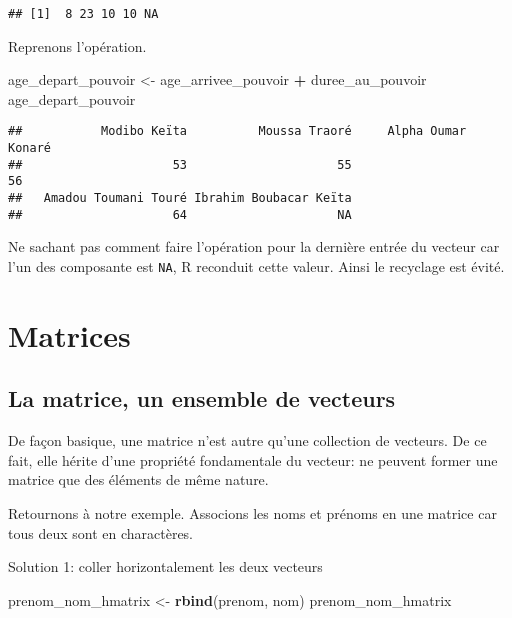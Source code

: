 \documentclass[]{book}
\newenvironment{Shaded}{\begin{snugshade}}{\end{snugshade}}
\newcommand{\KeywordTok}[1]{\textcolor[rgb]{0.13,0.29,0.53}{\textbf{#1}}}
\newcommand{\StringTok}[1]{\textcolor[rgb]{0.31,0.60,0.02}{#1}}
\newcommand{\OperatorTok}[1]{\textcolor[rgb]{0.81,0.36,0.00}{\textbf{#1}}}
\newcommand{\NormalTok}[1]{#1}
\begin{document}
\begin{verbatim}
## [1]  8 23 10 10 NA
\end{verbatim}

Reprenons l'opération.

\begin{Shaded}
\begin{Highlighting}[]
\NormalTok{age_depart_pouvoir <-}\StringTok{ }\NormalTok{age_arrivee_pouvoir }\OperatorTok{+}\StringTok{ }\NormalTok{duree_au_pouvoir}
\NormalTok{age_depart_pouvoir}
\end{Highlighting}
\end{Shaded}

\begin{verbatim}
##           Modibo Keïta          Moussa Traoré     Alpha Oumar Konaré 
##                     53                     55                     56 
##   Amadou Toumani Touré Ibrahim Boubacar Keïta 
##                     64                     NA
\end{verbatim}

Ne sachant pas comment faire l'opération pour la dernière entrée du
vecteur car l'un des composante est \texttt{NA}, R reconduit cette
valeur. Ainsi le recyclage est évité.

\section{Matrices}\label{matrices}

\subsection{La matrice, un ensemble de
vecteurs}\label{la-matrice-un-ensemble-de-vecteurs}

De façon basique, une matrice n'est autre qu'une collection de vecteurs.
De ce fait, elle hérite d'une propriété fondamentale du vecteur: ne
peuvent former une matrice que des éléments de même nature.

Retournons à notre exemple. Associons les noms et prénoms en une matrice
car tous deux sont en charactères.

Solution 1: coller horizontalement les deux vecteurs

\begin{Shaded}
\begin{Highlighting}[]
\NormalTok{prenom_nom_hmatrix <-}\StringTok{ }\KeywordTok{rbind}\NormalTok{(prenom, nom)}
\NormalTok{prenom_nom_hmatrix}
\end{Highlighting}
\end{Shaded}
\end{document}
